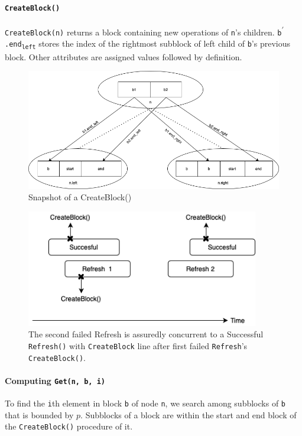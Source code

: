 \documentclass[10pt]{article}
\theoremstyle{definition}
\begin{document}
\pagebreak


\paragraph{\texttt{CreateBlock()}} \texttt{CreateBlock(n)} returns a block containing new operations of \texttt{n}'s children. \texttt{b\textsuperscript{$\prime$}.end\textsubscript{left}} stores the index of the rightmost subblock of left child of \texttt{b}'s previous block. Other attributes are assigned values followed by definition.
\begin{figure}[hbt]
  \center\includegraphics[width=5.5in]{pics/createblock}
  \caption{\label{fig::createBlock}Snapshot of a CreateBlock()}
\end{figure}



\begin{figure}[hbt]
  \center\includegraphics[width=4in]{pics/doublerefresh.png}
  \caption{The second failed Refresh is assuredly concurrent to a Successful \texttt{Refresh()} with \texttt{CreateBlock} line after first failed \texttt{Refresh}'s \texttt{CreateBlock()}.}
\end{figure}


\pagebreak


\paragraph{Computing \texttt{Get(n, b, i)}}
To find the \texttt{i}th element in block \texttt{b} of node \texttt{n}, we search among subblocks of \texttt{b} that is bounded by $p$. Subblocks of a block are within the start and end block of the \texttt{CreateBlock()} procedure of it.
\end{document}
